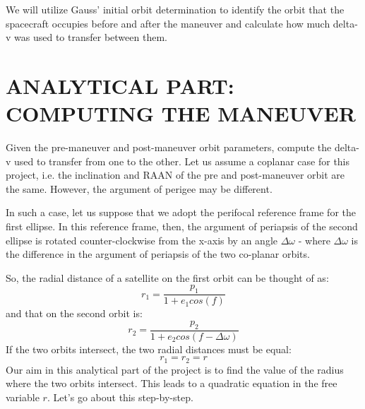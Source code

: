 \documentclass[12pt, letterpaper]{aiaa-tc}
\begin{document}
We will utilize Gauss' initial orbit determination to identify the orbit that the spacecraft occupies before and
after the maneuver and calculate how much delta-v was used to transfer between them.


\section{ANALYTICAL PART: COMPUTING THE MANEUVER}

Given the pre-maneuver and post-maneuver orbit parameters, compute the delta-v used to transfer from one to the
other. Let us assume a coplanar case for this project, i.e. the inclination and RAAN of the pre and post-maneuver
orbit are the same. However, the argument of perigee may be different.

In such a case, let us suppose that we adopt the perifocal reference frame for the first ellipse. In this reference
frame, then, the argument of periapsis of the second ellipse is rotated counter-clockwise from the x-axis by an
angle $\Delta\omega$ - where $\Delta\omega$ is the difference in the argument of periapsis of the two co-planar orbits.

So, the radial distance of a satellite on the first orbit can be thought of as:
\begin{equation}
    r_1=\frac{p_1}{1+e_1 cos(f)}
    \label{eq:orbitequation1}
\end{equation}
and that on the second orbit is:
\begin{equation}
    r_2=\frac{p_2}{1+e_2 cos(f-\Delta\omega)}
    \label{eq:orbitequation2}
\end{equation}
If the two orbits intersect, the two radial distances must be equal:
\[ r_1=r_2=r \]
Our aim in this analytical part of the project is to find the value of the radius where the two orbits intersect. This
leads to a quadratic equation in the free variable $r$. Let's go about this step-by-step.
\end{document}
